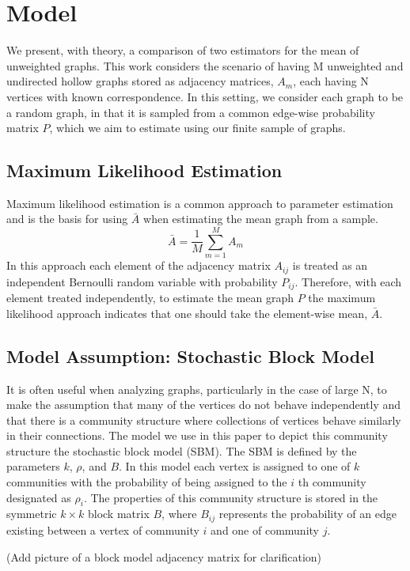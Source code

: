 \section{Model}
We present, with theory, a comparison of two estimators for the mean of unweighted graphs.  This work considers the scenario of having M unweighted and undirected hollow graphs stored as adjacency matrices, $A_m$, each having N vertices with known correspondence.  In this setting, we consider each graph to be a random graph, in that it is sampled from a common edge-wise probability matrix $P$, which we aim to estimate using our finite sample of graphs.
\subsection{Maximum Likelihood Estimation}
Maximum likelihood estimation is a common approach to parameter estimation and is the basis for using $\bar{A}$ when estimating the mean graph from a sample.
\begin{equation}
\bar{A} = \frac{1}{M}\sum\limits_{m = 1}^M A_m
\end{equation}
In this approach each element of the adjacency matrix $A_{ij}$ is treated as an independent Bernoulli random variable with probability $P_{ij}$.  Therefore, with each element treated independently, to estimate the mean graph $P$ the maximum likelihood approach indicates that one should take the element-wise mean, $\bar{A}$.
\subsection{Model Assumption: Stochastic Block Model}
It is often useful when analyzing graphs, particularly in the case of large N, to make the assumption that many of the vertices do not behave independently and that there is a community structure where collections of vertices behave similarly in their connections. The model we use in this paper to depict this community structure the stochastic block model (SBM).  The SBM is defined by the parameters $k$, $\rho$, and $B$. In this model each vertex is assigned to one of $k$ communities with the probability of being assigned to the $i$ th community designated as $\rho_i$.  The properties of this community structure is stored in the symmetric $k\times k$ block matrix $B$, where $B_{ij}$ represents the probability of an edge existing between a vertex of community $i$ and one of community $j$.

(Add picture of a block model adjacency matrix for clarification)

